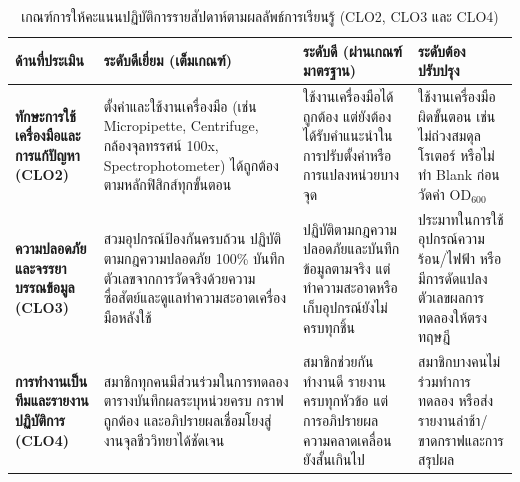 \begin{table}[H]
\centering
\caption{เกณฑ์การให้คะแนนปฏิบัติการรายสัปดาห์ตามผลลัพธ์การเรียนรู้ (CLO2, CLO3 และ CLO4)}
\footnotesize\setlength{\tabcolsep}{4pt}
\begin{tabularx}{\textwidth}{>{\raggedright\arraybackslash\bfseries}p{2.6cm} >{\raggedright\arraybackslash}X >{\raggedright\arraybackslash}X >{\raggedright\arraybackslash}X}
\toprule
ด้านที่ประเมิน & ระดับดีเยี่ยม (เต็มเกณฑ์) & ระดับดี (ผ่านเกณฑ์มาตรฐาน) & ระดับต้องปรับปรุง \\
\midrule
ทักษะการใช้เครื่องมือและการแก้ปัญหา (CLO2) & ตั้งค่าและใช้งานเครื่องมือ (เช่น Micropipette, Centrifuge, กล้องจุลทรรศน์ 100x, Spectrophotometer) ได้ถูกต้องตามหลักฟิสิกส์ทุกขั้นตอน & ใช้งานเครื่องมือได้ถูกต้อง แต่ยังต้องได้รับคำแนะนำในการปรับตั้งค่าหรือการแปลงหน่วยบางจุด & ใช้งานเครื่องมือผิดขั้นตอน เช่น ไม่ถ่วงสมดุลโรเตอร์ หรือไม่ทำ Blank ก่อนวัดค่า $\text{OD}_{600}$ \\
\addlinespace[4pt]
ความปลอดภัยและจรรยาบรรณข้อมูล (CLO3) & สวมอุปกรณ์ป้องกันครบถ้วน ปฏิบัติตามกฎความปลอดภัย 100\% บันทึกตัวเลขจากการวัดจริงด้วยความซื่อสัตย์และดูแลทำความสะอาดเครื่องมือหลังใช้ & ปฏิบัติตามกฎความปลอดภัยและบันทึกข้อมูลตามจริง แต่ทำความสะอาดหรือเก็บอุปกรณ์ยังไม่ครบทุกชิ้น & ประมาทในการใช้อุปกรณ์ความร้อน/ไฟฟ้า หรือมีการดัดแปลงตัวเลขผลการทดลองให้ตรงทฤษฎี \\
\addlinespace[4pt]
การทำงานเป็นทีมและรายงานปฏิบัติการ (CLO4) & สมาชิกทุกคนมีส่วนร่วมในการทดลอง ตารางบันทึกผลระบุหน่วยครบ กราฟถูกต้อง และอภิปรายผลเชื่อมโยงสู่งานจุลชีววิทยาได้ชัดเจน & สมาชิกช่วยกันทำงานดี รายงานครบทุกหัวข้อ แต่การอภิปรายผลความคลาดเคลื่อนยังสั้นเกินไป & สมาชิกบางคนไม่ร่วมทำการทดลอง หรือส่งรายงานล่าช้า/ขาดกราฟและการสรุปผล \\
\bottomrule
\end{tabularx}
\end{table}
